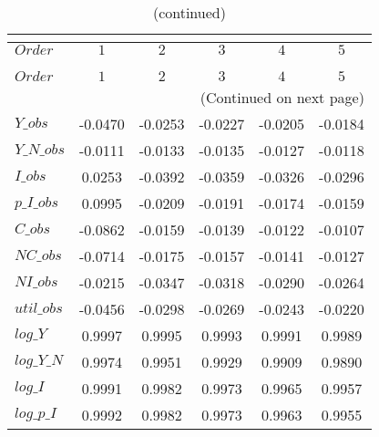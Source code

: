  
\begin{center}
\begin{longtable}{lccccc} 
\caption{COEFFICIENTS OF AUTOCORRELATION}\\
 \label{Table:th_autocorr_matrix}\\
\toprule 
$Order      $	 & 	 $          1$	 & 	 $          2$	 & 	 $          3$	 & 	 $          4$	 & 	 $          5$\\
\midrule \endfirsthead 
\caption{(continued)}\\
 \toprule \\ 
$Order      $	 & 	 $          1$	 & 	 $          2$	 & 	 $          3$	 & 	 $          4$	 & 	 $          5$\\
\midrule \endhead 
\midrule \multicolumn{6}{r}{(Continued on next page)} \\ \bottomrule \endfoot 
\bottomrule \endlastfoot 
$Y\_obs     $	 & 	    -0.0470	 & 	    -0.0253	 & 	    -0.0227	 & 	    -0.0205	 & 	    -0.0184 \\ 
$Y\_N\_obs  $	 & 	    -0.0111	 & 	    -0.0133	 & 	    -0.0135	 & 	    -0.0127	 & 	    -0.0118 \\ 
$I\_obs     $	 & 	     0.0253	 & 	    -0.0392	 & 	    -0.0359	 & 	    -0.0326	 & 	    -0.0296 \\ 
$p\_I\_obs  $	 & 	     0.0995	 & 	    -0.0209	 & 	    -0.0191	 & 	    -0.0174	 & 	    -0.0159 \\ 
$C\_obs     $	 & 	    -0.0862	 & 	    -0.0159	 & 	    -0.0139	 & 	    -0.0122	 & 	    -0.0107 \\ 
$NC\_obs    $	 & 	    -0.0714	 & 	    -0.0175	 & 	    -0.0157	 & 	    -0.0141	 & 	    -0.0127 \\ 
$NI\_obs    $	 & 	    -0.0215	 & 	    -0.0347	 & 	    -0.0318	 & 	    -0.0290	 & 	    -0.0264 \\ 
$util\_obs  $	 & 	    -0.0456	 & 	    -0.0298	 & 	    -0.0269	 & 	    -0.0243	 & 	    -0.0220 \\ 
$log\_Y     $	 & 	     0.9997	 & 	     0.9995	 & 	     0.9993	 & 	     0.9991	 & 	     0.9989 \\ 
$log\_Y\_N  $	 & 	     0.9974	 & 	     0.9951	 & 	     0.9929	 & 	     0.9909	 & 	     0.9890 \\ 
$log\_I     $	 & 	     0.9991	 & 	     0.9982	 & 	     0.9973	 & 	     0.9965	 & 	     0.9957 \\ 
$log\_p\_I  $	 & 	     0.9992	 & 	     0.9982	 & 	     0.9973	 & 	     0.9963	 & 	     0.9955 \\ 

\end{longtable}
\end{center}
